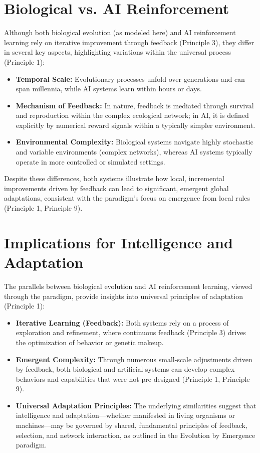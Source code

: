 \documentclass[12pt,openany]{book}
\begin{document}
\section{Biological vs. AI Reinforcement}
Although both biological evolution (as modeled here) and AI reinforcement learning rely on iterative improvement through feedback (Principle 3), they differ in several key aspects, highlighting variations within the universal process (Principle 1):
\begin{itemize}
    \item \textbf{Temporal Scale:} Evolutionary processes unfold over generations and can span millennia, while AI systems learn within hours or days.
    \item \textbf{Mechanism of Feedback:} In nature, feedback is mediated through survival and reproduction within the complex ecological network; in AI, it is defined explicitly by numerical reward signals within a typically simpler environment.
    \item \textbf{Environmental Complexity:} Biological systems navigate highly stochastic and variable environments (complex networks), whereas AI systems typically operate in more controlled or simulated settings.
\end{itemize}
Despite these differences, both systems illustrate how local, incremental improvements driven by feedback can lead to significant, emergent global adaptations, consistent with the paradigm's focus on emergence from local rules (Principle 1, Principle 9). %

\section{Implications for Intelligence and Adaptation}
The parallels between biological evolution and AI reinforcement learning, viewed through the paradigm, provide insights into universal principles of adaptation (Principle 1):
\begin{itemize}
    \item \textbf{Iterative Learning (Feedback):} Both systems rely on a process of exploration and refinement, where continuous feedback (Principle 3) drives the optimization of behavior or genetic makeup.
    \item \textbf{Emergent Complexity:} Through numerous small-scale adjustments driven by feedback, both biological and artificial systems can develop complex behaviors and capabilities that were not pre-designed (Principle 1, Principle 9).
    \item \textbf{Universal Adaptation Principles:} The underlying similarities suggest that intelligence and adaptation—whether manifested in living organisms or machines—may be governed by shared, fundamental principles of feedback, selection, and network interaction, as outlined in the Evolution by Emergence paradigm.
\end{itemize} %
\end{document}
